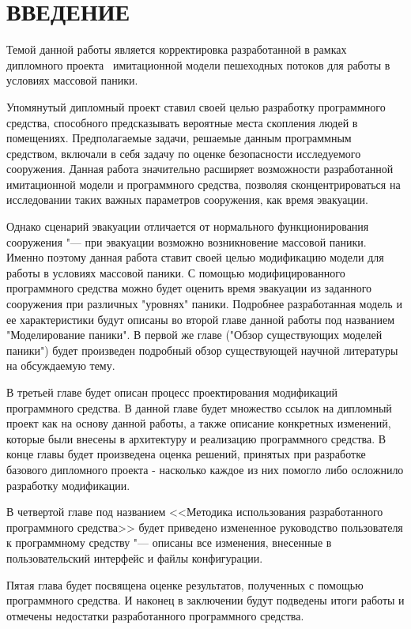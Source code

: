 \chapter*{ВВЕДЕНИЕ}

\label{sec:intro}

Темой данной работы является корректировка разработанной в рамках дипломного проекта~\cite{my_diploma} имитационной модели пешеходных потоков для работы в условиях массовой паники.

Упомянутый дипломный проект ставил своей целью разработку программного средства, способного предсказывать вероятные места скопления людей в помещениях.
Предполагаемые задачи, решаемые данным программным средством, включали в себя задачу по оценке безопасности исследуемого сооружения.
Данная работа значительно расширяет возможности разработанной имитационной модели и программного средства, позволяя сконцентрироваться на исследовании таких важных параметров сооружения, как время эвакуации.

Однако сценарий эвакуации отличается от нормального функционирования сооружения "--- при эвакуации возможно возникновение массовой паники.
Именно поэтому данная работа ставит своей целью модификацию модели для работы в условиях массовой паники.
С помощью модифицированного программного средства можно будет оценить время эвакуации из заданного сооружения при различных "уровнях" паники.
Подробнее разработанная модель и ее характеристики будут описаны во второй главе данной работы под названием "Моделирование паники".
В первой же главе ("Обзор существующих моделей паники") будет произведен подробный обзор существующей научной литературы на обсуждаемую тему.

В третьей главе будет описан процесс проектирования модификаций программного средства.
В данной главе будет множество ссылок на дипломный проект как на основу данной работы, а также описание конкретных изменений, которые были внесены в архитектуру и реализацию программного средства.
В конце главы будет произведена оценка решений, принятых при разработке базового дипломного проекта - насколько каждое из них помогло либо осложнило разработку модификации.

В четвертой главе под названием <<Методика использования разработанного программного средства>> будет приведено измененное руководство пользователя к программному средству
"--- описаны все изменения, внесенные в пользовательский интерфейс и файлы конфигурации.

Пятая глава будет посвящена оценке результатов, полученных с помощью программного средства.
И наконец в заключении будут подведены итоги работы и отмечены недостатки разработанного программного средства.
